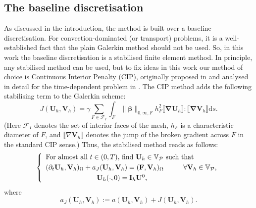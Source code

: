 \documentclass[final,12pt]{amsart}
\theoremstyle{plain}
\theoremstyle{definition}
\newcommand\bbeta{{\boldsymbol{\beta}}}
\newcommand\calP{{\mathcal{P}}}
\newcommand\calF{\mathcal{F}}
\newcommand\bU{\mathbf{U}}
\newcommand\bV{\mathbf{V}}
\begin{document}
\subsection{The baseline discretisation}

As discussed in the introduction, the method is built over a baseline discretisation. For convection-dominated (or transport) problems, it is a well-established fact that the plain Galerkin method should not 
be used. So, in this work the baseline discretisation is a stabilised finite element method. In principle,
any stabilised method can be used, but to fix ideas in this work our method of choice
is Continuous Interior Penalty (CIP), originally proposed in \cite{MR2068903} and analysed in detail for the time-dependent problem in \cite{BF09}. The CIP 
method adds the following stabilising term to the Galerkin scheme:
\begin{equation}
	J(\bU_h^{},\bV_h^{})=\gamma \sum_{F\in\calF_I^{}}\int_F\|\bbeta \|_{0,\infty,F}^{} h_{F}^{2}\llbracket  \boldsymbol \nabla \bU_{h} \rrbracket :\llbracket \boldsymbol \nabla \bV_{h}  \rrbracket   \mathrm{d}s . \label{eq10}
\end{equation}
(Here $\calF_I$ denotes the set of interior faces of the mesh, $h_F$ is a characteristic diameter of $F$, and $\llbracket \nabla \mathbf{V}_h\rrbracket$ denotes the jump of the broken gradient across $F$ in the standard CIP sense.)
Thus, the stabilised method reads as follows: 
\begin{equation}
	\begin{split}
		\left\{ \begin{array}{ll}
			\text{For almost all $t\in  (0,T)$, find $\mathbf{U}_{h}\in \mathbb{V}_{\calP}$ such that} \vspace{.1cm}
			\\  
			(\partial_{t}\mathbf{U}_{h},\mathbf{V}_{h})_{\Omega} + a_{J}(\mathbf{U}_{h},\mathbf{V}_{h}) = (\mathbf{F},\mathbf{V}_{h})_{\Omega} \hspace{1cm} \forall \mathbf{V}_{h}\in \mathbb{V}_\calP,  \vspace{.1cm}\\
			\hspace{2.6cm} \mathbf{U}_{h}(\cdot,0) = \mathbf{I}_{h}\mathbf{U}^{0},
		\end{array} \right.\label{eq824}
	\end{split}
\end{equation}
where
\begin{equation}
	a_{J}(\mathbf{U}_{h},\mathbf{V}_{h}):=a(\mathbf{U}_{h},\mathbf{V}_{h})+	J(\mathbf{U}_{h},\mathbf{V}_{h}) .\label{eq12}
\end{equation}
\end{document}

